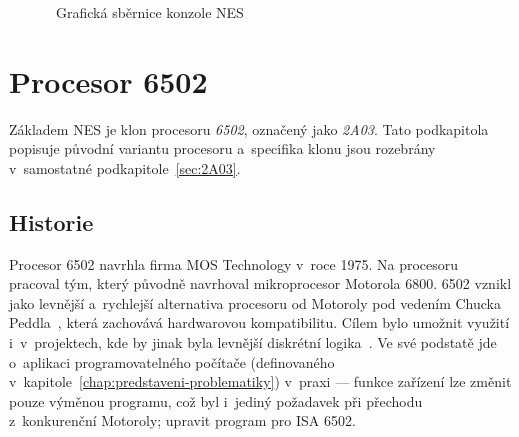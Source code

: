 \begin{figure}[ht!]
	\centering
	\caption{~Grafická sběrnice konzole NES}\label{fig:nes-grafickasbernice}
\end{figure}

\section{Procesor 6502}
Základem NES je klon procesoru \emph{6502}, označený jako \emph{2A03}. Tato podkapitola popisuje původní variantu procesoru a~specifika klonu jsou rozebrány v~samostatné podkapitole~\ref{sec:2A03}.

\subsection{Historie}
Procesor 6502 navrhla firma MOS Technology v~roce 1975. Na procesoru pracoval tým, který původně navrhoval mikroprocesor Motorola 6800. 6502 vznikl jako levnější a~rychlejší alternativa procesoru od Motoroly pod vedením Chucka Peddla~\cite{computer-history-museum:chuck-peddle}, která zachovává hardwarovou kompatibilitu. Cílem bylo umožnit využití i~v~projektech, kde by jinak byla levnější diskrétní logika~\cite{mos:hw-manual}. Ve své podstatě jde o~aplikaci programovatelného počítače (definovaného v~kapitole~\ref{chap:predstaveni-problematiky}) v~praxi --- funkce zařízení lze změnit pouze výměnou programu, což byl i~jediný požadavek při přechodu z~konkurenční Motoroly; upravit program pro ISA 6502.

